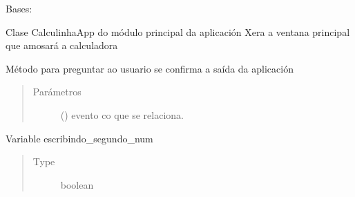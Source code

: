 \documentclass[letterpaper,10pt,spanish]{sphinxmanual}
\begin{document}
\begin{fulllineitems}
\label{\detokenize{api/modulos:calculadora_infantil.CalculinhaApp}}
\sphinxAtStartPar
Bases: 

\sphinxAtStartPar
Clase CalculinhaApp do módulo principal da aplicación
Xera a ventana principal que amosará a calculadora

\begin{fulllineitems}
\label{\detokenize{api/modulos:calculadora_infantil.CalculinhaApp.closeEvent}}
\sphinxAtStartPar
Método para preguntar ao usuario se confirma a saída da aplicación
\begin{quote}\begin{description}
\item[{Parámetros}] \leavevmode
\sphinxAtStartPar
{} () \textendash{} evento co que se relaciona.

\end{description}\end{quote}

\end{fulllineitems}


\begin{fulllineitems}
\label{\detokenize{api/modulos:calculadora_infantil.CalculinhaApp.escribindo_segundo_num}}
\sphinxAtStartPar
Variable escribindo\_segundo\_num
\begin{quote}\begin{description}
\item[{Type}] \leavevmode
\sphinxAtStartPar
boolean

\end{description}\end{quote}


\end{fulllineitems}
\end{fulllineitems}
\end{document}
